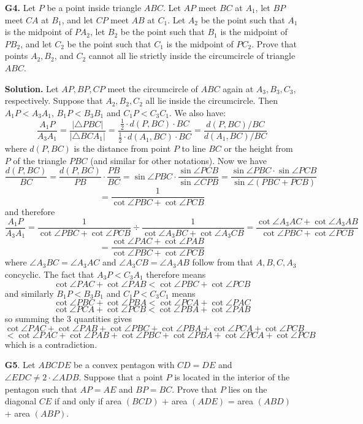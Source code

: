 \documentclass[11pt,a4paper]{article}
\begin{document}
\begin{enumerate}
	\item [\textbf{G4.}] Let $P$ be a point inside triangle $ABC$. Let $AP$ meet $BC$ at $A_1$, let $BP$ meet $CA$ at $B_1$, and let $CP$ meet $AB$ at $C_1$. Let $A_2$ be the point such that $A_1$ is the midpoint of $PA_2$, let $B_2$ be the point such that $B_1$ is the midpoint of $PB_2$, and let $C_2$ be the point such that $C_1$ is the midpoint of $PC_2$. Prove that points $A_2, B_2$, and $C_2$ cannot all lie strictly inside the circumcircle of triangle $ABC$.
	
	\textbf{Solution.} Let $AP, BP, CP$ meet the circumcircle of $ABC$ again at $A_3, B_3, C_3$, respectively. 
	Suppose that $A_2, B_2, C_2$ all lie inside the circumcircle. Then $A_1P<A_3A_1$, $B_1P<B_3B_1$ and $C_1P<C_3C_1$. We also have: 
	\[
	\frac{A_1P}{A_3A_1}
	=\frac{|\triangle PBC|}{|\triangle BCA_1|}
	=\frac{\frac 12 \cdot d(P, BC)\cdot BC }{\frac 12 \cdot d(A_1, BC)\cdot BC}
	=\frac{d(P, BC) / BC}{d(A_1, BC) / BC}
	\]
	where $d(P, BC)$ is the distance from point $P$ to line $BC$ or the height from $P$ of the triangle $PBC$ (and similar for other notations). 
	Now we have 
	\[
	\frac{d(P, BC)}{BC}
	=\frac{d(P, BC)}{PB}\cdot \frac{PB}{BC}
	=\sin \angle PBC\cdot \frac{\sin\angle PCB}{\sin\angle CPB}
	=\frac{\sin \angle PBC\cdot\sin \angle PCB}{\sin \angle (PBC+PCB)}
	\]\[
	=\frac{1}{\cot\angle PBC + \cot\angle PCB}
	\]
	and therefore 
	\[
	\frac{A_1P}{A_3A_1}
	=\frac{1}{\cot\angle PBC + \cot\angle PCB}\div \frac{1}{\cot\angle A_3BC + \cot\angle A_3CB}
	=\frac{\cot\angle A_3AC + \cot\angle A_3AB}{\cot\angle PBC + \cot\angle PCB}
	\]\[
	=\frac{\cot\angle PAC + \cot\angle PAB}{\cot\angle PBC + \cot\angle PCB}
	\]
	where $\angle A_3BC=\angle A_3AC$ and $\angle A_3CB=\angle A_3AB$ follow from that $A, B, C, A_3$ concyclic. The fact that $A_3P<C_3A_1$ therefore means 
	\[
	\cot\angle PAC + \cot\angle PAB< \cot\angle PBC + \cot\angle PCB
	\]
	and similarly $B_1P<B_3B_1$ and $C_1P<C_3C_1$ means 
	\[
	\cot\angle PBC + \cot\angle PBA< \cot\angle PCA + \cot\angle PAC
	\]\[
	\cot\angle PCA + \cot\angle PCB< \cot\angle PBA + \cot\angle PAB
	\]
	so summing the 3 quantities gives 
	\[
	\cot\angle PAC + \cot\angle PAB+\cot\angle PBC + \cot\angle PBA+\cot\angle PCA + \cot\angle PCB
	\]
	\[
	< \cot\angle PAC + \cot\angle PAB+\cot\angle PBC + \cot\angle PBA+\cot\angle PCA + \cot\angle PCB
	\]
	which is a contradiction. 
	
	\item [\textbf{G5}.] Let $ABCDE$ be a convex pentagon with $CD= DE$ and $\angle EDC \ne 2 \cdot \angle ADB$.
	Suppose that a point $P$ is located in the interior of the pentagon such that $AP =AE$ and $BP= BC$.
	Prove that $P$ lies on the diagonal $CE$ if and only if area $(BCD)$ + area $(ADE)$ = area $(ABD)$ + area $(ABP)$.
	

\end{enumerate}
\end{document}
